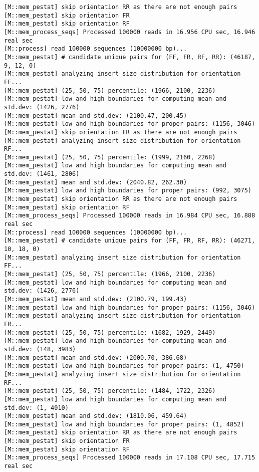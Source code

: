 \begin{lstlisting}
[M::mem_pestat] skip orientation RR as there are not enough pairs
[M::mem_pestat] skip orientation FR
[M::mem_pestat] skip orientation RF
[M::mem_process_seqs] Processed 100000 reads in 16.956 CPU sec, 16.946 real sec
[M::process] read 100000 sequences (10000000 bp)...
[M::mem_pestat] # candidate unique pairs for (FF, FR, RF, RR): (46187, 9, 12, 0)
[M::mem_pestat] analyzing insert size distribution for orientation FF...
[M::mem_pestat] (25, 50, 75) percentile: (1966, 2100, 2236)
[M::mem_pestat] low and high boundaries for computing mean and std.dev: (1426, 2776)
[M::mem_pestat] mean and std.dev: (2100.47, 200.45)
[M::mem_pestat] low and high boundaries for proper pairs: (1156, 3046)
[M::mem_pestat] skip orientation FR as there are not enough pairs
[M::mem_pestat] analyzing insert size distribution for orientation RF...
[M::mem_pestat] (25, 50, 75) percentile: (1999, 2160, 2268)
[M::mem_pestat] low and high boundaries for computing mean and std.dev: (1461, 2806)
[M::mem_pestat] mean and std.dev: (2040.82, 262.30)
[M::mem_pestat] low and high boundaries for proper pairs: (992, 3075)
[M::mem_pestat] skip orientation RR as there are not enough pairs
[M::mem_pestat] skip orientation RF
[M::mem_process_seqs] Processed 100000 reads in 16.984 CPU sec, 16.888 real sec
[M::process] read 100000 sequences (10000000 bp)...
[M::mem_pestat] # candidate unique pairs for (FF, FR, RF, RR): (46271, 10, 18, 0)
[M::mem_pestat] analyzing insert size distribution for orientation FF...
[M::mem_pestat] (25, 50, 75) percentile: (1966, 2100, 2236)
[M::mem_pestat] low and high boundaries for computing mean and std.dev: (1426, 2776)
[M::mem_pestat] mean and std.dev: (2100.79, 199.43)
[M::mem_pestat] low and high boundaries for proper pairs: (1156, 3046)
[M::mem_pestat] analyzing insert size distribution for orientation FR...
[M::mem_pestat] (25, 50, 75) percentile: (1682, 1929, 2449)
[M::mem_pestat] low and high boundaries for computing mean and std.dev: (148, 3983)
[M::mem_pestat] mean and std.dev: (2000.70, 386.68)
[M::mem_pestat] low and high boundaries for proper pairs: (1, 4750)
[M::mem_pestat] analyzing insert size distribution for orientation RF...
[M::mem_pestat] (25, 50, 75) percentile: (1484, 1722, 2326)
[M::mem_pestat] low and high boundaries for computing mean and std.dev: (1, 4010)
[M::mem_pestat] mean and std.dev: (1810.06, 459.64)
[M::mem_pestat] low and high boundaries for proper pairs: (1, 4852)
[M::mem_pestat] skip orientation RR as there are not enough pairs
[M::mem_pestat] skip orientation FR
[M::mem_pestat] skip orientation RF
[M::mem_process_seqs] Processed 100000 reads in 17.108 CPU sec, 17.715 real sec

\end{lstlisting}
